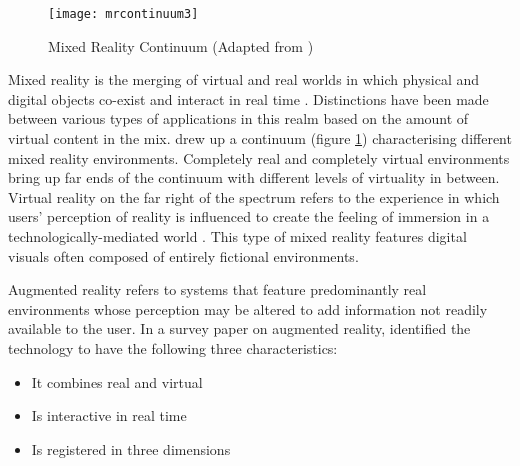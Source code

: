 \begin{figure}
	\centering
	\texttt{[image: mrcontinuum3]}
	\caption{Mixed Reality Continuum (Adapted from \cite{milgram1995augmented})}
	\label{fig:mixedrealitycontinuum}
\end{figure}

Mixed reality is the merging of virtual and real worlds in which physical and digital objects co-exist and interact in real time \parencite{wiki:mixedreality}. Distinctions have been made between various types of applications in this realm based on the amount of virtual content in the mix. \cite{milgram1995augmented} drew up a continuum (figure \ref{fig:mixedrealitycontinuum}) characterising different mixed reality environments. Completely real and completely virtual environments bring up far ends of the continuum with different levels of virtuality in between. Virtual reality on the far right of the spectrum refers to the experience in which users' perception of reality is influenced to create the feeling of immersion in a technologically-mediated world \parencite{steuer1992defining}. This type of mixed reality features  digital visuals often composed of entirely fictional environments. 

Augmented reality refers to systems that feature predominantly real environments whose perception may be altered to add information not readily available to the user. In a survey paper on augmented reality, \cite{azuma1997survey} identified the technology to have the following three characteristics: 
\begin{itemize}[noitemsep]
	\renewcommand{\labelitemi}{\scalebox{.9}{\tiny\listsymb}}
	\item It combines real and virtual 
	\item Is interactive in real time
	\item Is registered in three dimensions
\end{itemize} 



